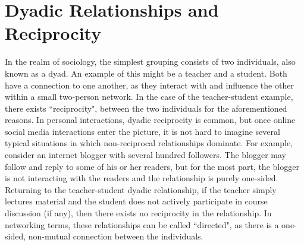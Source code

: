 \section{Dyadic Relationships and Reciprocity}
In the realm of sociology, the simplest grouping consists of two individuals, also known as a dyad. An example of this might be a teacher and a student. Both have a connection to one another, as they interact with and influence the other within a small two-person network. In the case of the teacher-student example, there exists ``reciprocity", between the two individuals for the aforementioned reasons. In personal interactions, dyadic reciprocity is common, but once online social media interactions enter the picture, it is not hard to imagine several typical situations in which non-reciprocal relationships dominate. For example, consider an internet blogger with several hundred followers. The blogger may follow and reply to some of his or her readers, but for the most part, the blogger is not interacting with the readers and the relationship is purely one-sided. Returning to the teacher-student dyadic relationship, if the teacher simply lectures material and the student does not actively participate in course discussion (if any), then there exists no reciprocity in the relationship. In networking terms, these relationships can be called ``directed", as there is a one-sided, non-mutual connection between the individuals.

